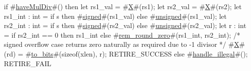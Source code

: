 if #\hyperref[sailRISCVzhaveMulDiv]{haveMulDiv}#() then {
  let rs1_val = #\hyperref[sailRISCVzX]{X}#(rs1);
  let rs2_val = #\hyperref[sailRISCVzX]{X}#(rs2);
  let rs1_int : int = if s then #\hyperref[sailRISCVzsigned]{signed}#(rs1_val) else #\hyperref[sailRISCVzunsigned]{unsigned}#(rs1_val);
  let rs2_int : int = if s then #\hyperref[sailRISCVzsigned]{signed}#(rs2_val) else #\hyperref[sailRISCVzunsigned]{unsigned}#(rs2_val);
  let r : int = if rs2_int == 0 then rs1_int else #\hyperref[sailRISCVzremzyroundzyzzero]{rem\_round\_zero}#(rs1_int, rs2_int);
  /* signed overflow case returns zero naturally as required due to -1 divisor */
  #\hyperref[sailRISCVzX]{X}#(rd) = #\hyperref[sailRISCVztozybits]{to\_bits}#(sizeof(xlen), r);
  RETIRE_SUCCESS
} else {
  #\hyperref[sailRISCVzhandlezyillegal]{handle\_illegal}#();
  RETIRE_FAIL
}
